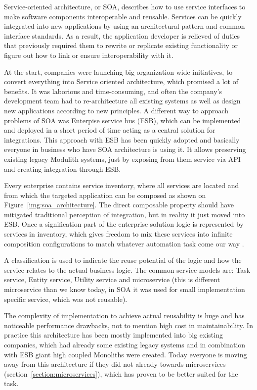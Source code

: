 Service-oriented architecture, or SOA, describes how to use service interfaces to make software components interoperable and reusable. Services can be quickly integrated into new applications by using an architectural pattern and common interface standards. As a result, the application developer is relieved of duties that previously required them to rewrite or replicate existing functionality or figure out how to link or ensure interoperability with it. \cite{IBM_SOA}

At the start, companies were launching big organization wide initiatives, to convert everything into Service oriented architecture, which promised a lot of benefits. It was laborious and time-consuming, and often the company's development team had to re-architecture all existing systems as well as design new applications according to new principles. A different way to approach problems of SOA was Enterpise service bus (ESB), which can be implemented and deployed in a short period of time acting as a central solution for integrations. This approach with ESB has been quickly adopted and basically everyone in business who have SOA architecture is using it. It allows preserving existing legacy Modulith systems, just by exposing from them service via API and creating integration through ESB.

Every enterprise contains service inventory, where all services are located and from which the targeted application can be composed as shown on Figure~\ref{img:soa_architecture}. The direct composable property should have mitigated traditional perception of integration, but in reality it just moved into ESB. Once a signification part of the enterprise solution logic is represented by services in inventory, which gives freedom to mix these services into infinite composition configurations to match whatever automation task come our way \cite{SERVICE_ORIENTED_ARCHITECTURE}.

A classification is used to indicate the reuse potential of the logic and how the service relates to the actual business logic. The common service models are: Task service, Entity service, Utility service and microservice (this is different microservice than we know today, in SOA it was used for small implementation specific service, which was not reusable). \cite{SERVICE_ORIENTED_ARCHITECTURE}

The complexity of implementation to achieve actual reusability is huge and has noticeable performance drawbacks, not to mention high cost in maintainability. In practice this architecture has been mostly implemented into big existing companies, which had already some existing legacy systems and in combination with ESB giant high coupled Monoliths were created. Today everyone is moving away from this architecture if they did not already towards microservices (section~\ref{section:microservices}), which has proven to be better suited for the task.

